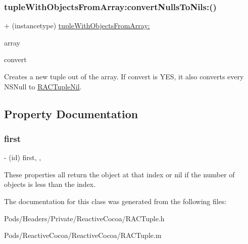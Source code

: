 \subsubsection{\texorpdfstring{tuple\+With\+Objects\+From\+Array\+:convert\+Nulls\+To\+Nils\+:()}{tupleWithObjectsFromArray:convertNullsToNils:()}\hspace{0.1cm}{\footnotesize\ttfamily [3/3]}}
{\footnotesize\ttfamily + (instancetype) \mbox{\hyperlink{interface_r_a_c_tuple_a3a1907a961d70cac573b0a4daea43834}{tuple\+With\+Objects\+From\+Array\+:}} \begin{DoxyParamCaption}\item[{(N\+S\+Array $\ast$)}]{array }\item[{convertNullsToNils:(B\+O\+OL)}]{convert }\end{DoxyParamCaption}}

Creates a new tuple out of the array. If {\ttfamily convert} is Y\+ES, it also converts every N\+S\+Null to \mbox{\hyperlink{interface_r_a_c_tuple_nil}{R\+A\+C\+Tuple\+Nil}}. 

\subsection{Property Documentation}
\mbox{\label{interface_r_a_c_tuple_a663c06d1f88cde0fc952bc2540c12c54}} 
\subsubsection{\texorpdfstring{first}{first}}
{\footnotesize\ttfamily -\/ (id) first\hspace{0.3cm}{\ttfamily [read]}, {\ttfamily [nonatomic]}, {\ttfamily [assign]}}

These properties all return the object at that index or nil if the number of objects is less than the index. 

The documentation for this class was generated from the following files\+:\begin{DoxyCompactItemize}
\item 
Pods/\+Headers/\+Private/\+Reactive\+Cocoa/R\+A\+C\+Tuple.\+h\item 
Pods/\+Reactive\+Cocoa/\+Reactive\+Cocoa/R\+A\+C\+Tuple.\+m\end{DoxyCompactItemize}
